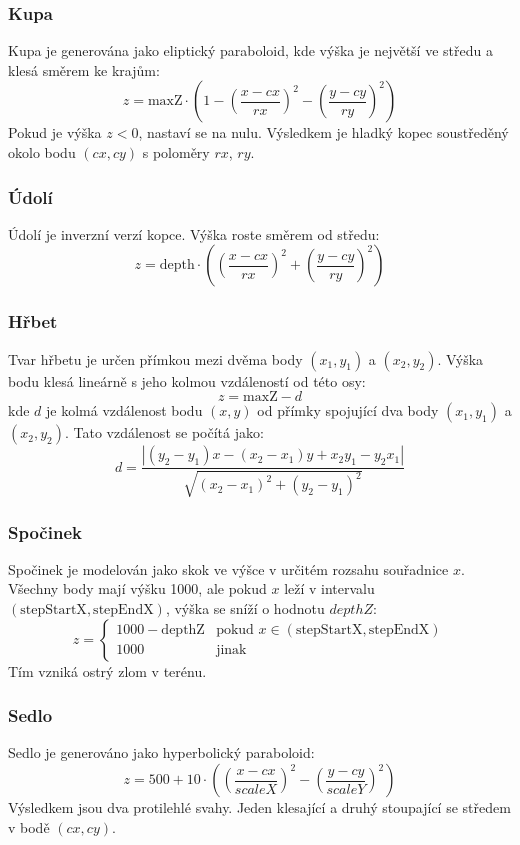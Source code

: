 \subsubsection{Kupa}
Kupa je generována jako eliptický paraboloid, kde výška je největší ve středu a klesá směrem ke krajům:
\[
z = \text{maxZ} \cdot \left(1 - \left(\frac{x - cx}{rx}\right)^2 - \left(\frac{y - cy}{ry}\right)^2\right)
\]
Pokud je výška $z < 0$, nastaví se na nulu. Výsledkem je hladký kopec soustředěný okolo bodu $(cx, cy)$ s poloměry $rx$, $ry$.

\subsubsection{Údolí}
Údolí je inverzní verzí kopce. Výška roste směrem od středu:
\[
z = \text{depth} \cdot \left(\left(\frac{x - cx}{rx}\right)^2 + \left(\frac{y - cy}{ry}\right)^2\right)
\]

\subsubsection{Hřbet}
Tvar hřbetu je určen přímkou mezi dvěma body $(x_1, y_1)$ a $(x_2, y_2)$. Výška bodu klesá lineárně s jeho kolmou vzdáleností od této osy:
\[
z = \text{maxZ} - d
\]
kde $d$ je kolmá vzdálenost bodu $(x, y)$ od přímky spojující dva body $(x_1, y_1)$ a $(x_2, y_2)$. Tato vzdálenost se počítá jako:
\[
d = \frac{|(y_2 - y_1)x - (x_2 - x_1)y + x_2 y_1 - y_2 x_1|}{\sqrt{(x_2 - x_1)^2 + (y_2 - y_1)^2}}
\]

\subsubsection{Spočinek}
Spočinek je modelován jako skok ve výšce v určitém rozsahu souřadnice $x$. Všechny body mají výšku 1000, ale pokud $x$ leží v intervalu $(\text{stepStartX}, \text{stepEndX})$, výška se sníží o hodnotu $depthZ$:
\[
z = \begin{cases}
1000 - \text{depthZ} & \text{pokud } x \in (\text{stepStartX}, \text{stepEndX}) \\
1000 & \text{jinak}
\end{cases}
\]
Tím vzniká ostrý zlom v terénu.

\subsubsection{Sedlo}
Sedlo je generováno jako hyperbolický paraboloid:
\[
z = 500 + 10 \cdot \left(\left(\frac{x - cx}{scaleX}\right)^2 - \left(\frac{y - cy}{scaleY}\right)^2\right)
\]
Výsledkem jsou dva protilehlé svahy. Jeden klesající a druhý stoupající se středem v bodě $(cx, cy)$.

